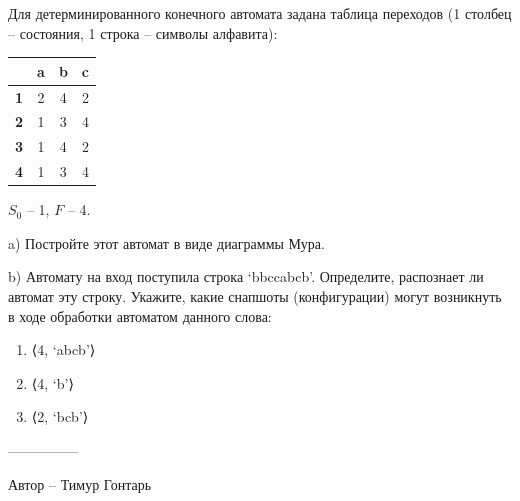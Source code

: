 \question
Для детерминированного конечного автомата задана таблица переходов (1 столбец – состояния, 1 строка – символы алфавита):

\begin{tabular}{||c | c |c| c||} 
 \hline
 & \textbf{a} & \textbf{b} & \textbf{c} \\ 
 \hline\hline
 \textbf{1} & 2& 4& 2\\ 
 \hline
 \textbf{2} & 1& 3& 4\\
 \hline
 \textbf{3} & 1& 4& 2\\
 \hline
 \textbf{4} & 1& 3& 4\\
 \hline
\end{tabular}

$S_0$ – 1, $F$ – {4}.

a) Постройте этот автомат в виде диаграммы Мура.

b) Автомату на вход поступила строка ‘bbccabcb’. Определите, распознает ли автомат эту строку. Укажите, какие снапшоты (конфигурации) могут возникнуть в ходе обработки автоматом данного слова:

\begin{enumerate}
    \item ⟨4, ‘abcb’⟩
    \item ⟨4, ‘b’⟩
    \item ⟨2, ‘bcb’⟩
\end{enumerate}

---------------

Автор -- Тимур Гонтарь
